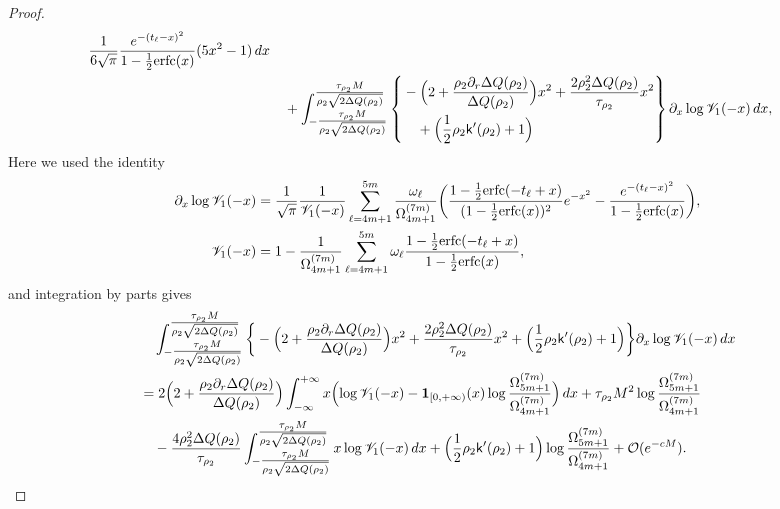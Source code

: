 \documentclass[a4paper]{article}
\newcommand{\erfc}{{\rm erfc}}
\numberwithin{equation}{section}
\begin{document}
\begin{proof}
\begin{align*}
\frac{1}{6\sqrt{\pi}}
\frac{e^{-(t_{\ell}-x)^2}}{1-\frac{1}{2}\erfc(x)}
(5x^2-1)
\,dx
\\
&\quad
+
\int_{-\tfrac{\tau_{\rho_2}M}{\rho_2\sqrt{2\Delta Q(\rho_2)}}}^{\tfrac{\tau_{\rho_2}M}{\rho_2\sqrt{2\Delta Q(\rho_2)}}}
\left\{\begin{aligned}&
-\Bigl(2+\frac{\rho_2\partial_r\Delta Q(\rho_2)}{\Delta Q(\rho_2)}\Bigr)x^2
+\frac{2\rho_2^2\Delta Q(\rho_2)}{\tau_{\rho_2}}x^2
\\
&\quad+\Bigl(\frac{1}{2}\rho_2\mathsf{k}'(\rho_2)+1\Bigr)
\end{aligned}\right\}
\partial_x\log\mathscr{V}_1(-x)
\,dx,
\end{align*}
Here we used the identity
\begin{align*}
\partial_x\log \mathscr{V}_1(-x)
&=
\frac{1}{\sqrt{\pi}}
\frac{1}{\mathscr{V}_1(-x)}
\sum_{\ell=4m+1}^{5m}\frac{\omega_{\ell}}{\Omega_{4m+1}^{(7m)}}
\bigg(
\frac{1-\frac{1}{2}\erfc(-t_{\ell}+x)}{(1-\frac{1}{2}\erfc(x))^2}e^{-x^2}
-\frac{e^{-(t_{\ell}-x)^2}}{1-\frac{1}{2}\erfc(x)}
\bigg),
\\
\mathscr{V}_1( -x)
&=1-\frac{1}{\Omega_{4m+1}^{(7m)}}\sum_{\ell=4m+1}^{5m}\omega_{\ell}
\frac{1-\frac{1}{2}\erfc(-t_{\ell}+x)}{1-\frac{1}{2}\erfc(x)}, 
\end{align*}
and integration by parts gives
\begin{align*}
&\quad
\int_{-\tfrac{\tau_{\rho_2}M}{\rho_2\sqrt{2\Delta Q(\rho_2)}}}^{\tfrac{\tau_{\rho_2}M}{\rho_2\sqrt{2\Delta Q(\rho_2)}}}
\bigg\{
-\Bigl(2+\frac{\rho_2\partial_r\Delta Q(\rho_2)}{\Delta Q(\rho_2)}\Bigr)x^2
+\frac{2\rho_2^2\Delta Q(\rho_2)}{\tau_{\rho_2}}x^2
+\Bigl(\frac{1}{2}\rho_2\mathsf{k}'(\rho_2)+1\Bigr)
\bigg\}
\partial_x\log\mathscr{V}_1( -x)
\,dx
\\
&=
2\Bigl(2+\frac{\rho_2\partial_r\Delta Q(\rho_2)}{\Delta Q(\rho_2)}\Bigr)
\int_{-\infty}^{+\infty}
x\Bigl( \log\mathscr{V}_1(-x) - \mathbf{1}_{[0,+\infty)}(x)\log\frac{\Omega_{5m+1}^{(7m)}}{\Omega_{4m+1}^{(7m)}}\Bigr)\,dx
+\tau_{\rho_2}M^2\log\frac{\Omega_{5m+1}^{(7m)}}{\Omega_{4m+1}^{(7m)}}
\\
&\quad 
-
\frac{4\rho_2^2\Delta Q(\rho_2)}{\tau_{\rho_2}}
\int_{-\tfrac{\tau_{\rho_2}M}{\rho_2\sqrt{2\Delta Q(\rho_2)}}}^{\tfrac{\tau_{\rho_2}M}{\rho_2\sqrt{2\Delta Q(\rho_2)}}}
x\log\mathscr{V}_1(-x)\,dx
+\Bigl(\frac{1}{2}\rho_2\mathsf{k}'(\rho_2)+1\Bigr)\log\frac{\Omega_{5m+1}^{(7m)}}{\Omega_{4m+1}^{(7m)}}
+\mathcal{O}(e^{-cM}).
\end{align*}

\end{proof}
\end{document}
